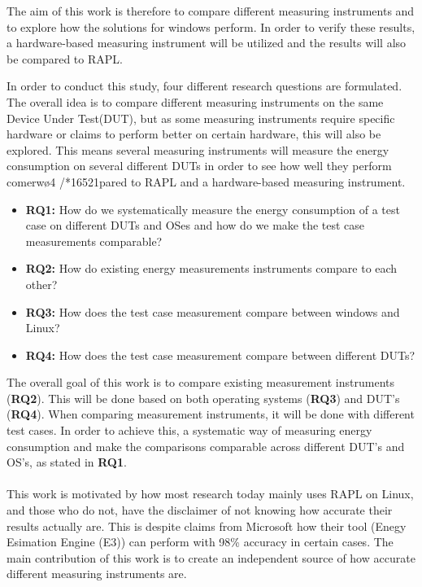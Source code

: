 The aim of this work is therefore to compare different measuring instruments and to explore how the solutions for windows perform. 
In order to verify these results, a hardware-based measuring instrument will be utilized and the results will also be compared to RAPL.

In order to conduct this study, four different research questions are formulated. The overall idea is to compare different measuring instruments on the same Device Under Test(DUT), but as some measuring instruments require specific hardware or claims to perform better on certain hardware, this will also be explored. This means several measuring instruments will measure the energy consumption on several different DUTs in order to see how well they perform comerwø4
/*16521pared to RAPL and a hardware-based measuring instrument.


\begin{itemize}
    \item \textbf{RQ1:} How do we systematically measure the energy consumption of a test case on different DUTs and OSes and how do we make the test case measurements comparable?
    \item \textbf{RQ2:} How do existing energy measurements instruments compare to each other?
    \item \textbf{RQ3:} How does the test case measurement compare between windows and Linux?
    \item \textbf{RQ4:} How does the test case measurement compare between different DUTs?
\end{itemize}

The overall goal of this work is to compare existing measurement instruments (\textbf{RQ2}). This will be done based on both operating systems (\textbf{RQ3}) and DUT's (\textbf{RQ4}). When comparing measurement instruments, it will be done with different test cases. In order to achieve this, a systematic way of measuring energy consumption and make the comparisons comparable across different DUT's and OS's, as stated in \textbf{RQ1}.

\paragraph*{}
This work is motivated by how most research today mainly uses RAPL on Linux\cite[]{Rasmussen2021,Pereira2017,Theilmann2022,Lindholt2022}, and those who do not, have the disclaimer of not knowing how accurate their results actually are\cite[]{Bruce2015ReducingEC, Ozturk2019, Unlu2021}. This is despite claims from Microsoft how their tool (Enegy Esimation Engine (E3)) can perform with 98\% accuracy in certain cases\cite[]{E3WinHec}. The main contribution of this work is to create an independent source of how accurate different measuring instruments are.

